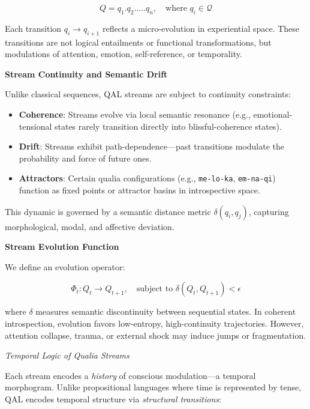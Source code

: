 \documentclass[11pt]{article}
\numberwithin{equation}{section} %
\begin{document}
\begin{equation}
Q = q_1 . q_2 . \dots . q_n, \quad \text{where } q_i \in \mathcal{Q}
\end{equation}

Each transition \( q_i \rightarrow q_{i+1} \) reflects a micro-evolution in experiential space. These transitions are not logical entailments or functional transformations, but modulations of attention, emotion, self-reference, or temporality.

\bigskip

\noindent\textbf{Stream Continuity and Semantic Drift}

Unlike classical sequences, QAL streams are subject to continuity constraints:

\begin{itemize}
  \item \textbf{Coherence}: Streams evolve via local semantic resonance (e.g., emotional-tensional states rarely transition directly into blissful-coherence states).
  \item \textbf{Drift}: Streams exhibit path-dependence—past transitions modulate the probability and force of future ones.
  \item \textbf{Attractors}: Certain qualia configurations (e.g., \texttt{me-lo-ka}, \texttt{em-na-qi}) function as fixed points or attractor basins in introspective space.
\end{itemize}

This dynamic is governed by a semantic distance metric \( \delta(q_i, q_j) \), capturing morphological, modal, and affective deviation.

\bigskip

\noindent\textbf{Stream Evolution Function}

We define an evolution operator:

\begin{equation}
\Phi_t : Q_t \rightarrow Q_{t+1}, \quad \text{subject to } \delta(Q_t, Q_{t+1}) < \epsilon
\end{equation}

\noindent where \( \delta \) measures semantic discontinuity between sequential states. In coherent introspection, evolution favors low-entropy, high-continuity trajectories. However, attention collapse, trauma, or external shock may induce jumps or fragmentation.

\bigskip

\noindent \textit{Temporal Logic of Qualia Streams}

Each stream encodes a \textit{history} of conscious modulation—a temporal morphogram. Unlike propositional languages where time is represented by tense, QAL encodes temporal structure via \textit{structural transitions}:
\end{document}
